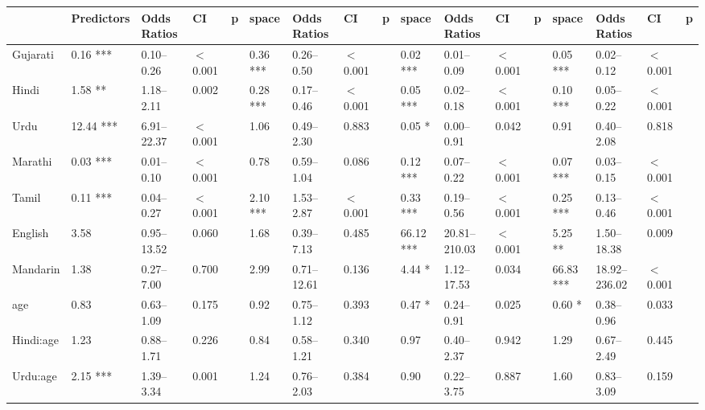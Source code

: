 \begin{table}[ht]
\centering
\begin{tabular}{}
  \hline
 & Predictors & Odds Ratios & CI & p & space & Odds Ratios & CI & p & space & Odds Ratios & CI & p & space & Odds Ratios & CI & p \\ 
  \hline

Gujarati & 0.16 *** & 0.10--0.26 & $<$0.001 &  & 0.36 *** & 0.26--0.50 & $<$0.001 &  & 0.02 *** & 0.01--0.09 & $<$0.001 &  & 0.05 *** & 0.02--0.12 & $<$0.001 \\ 

Hindi & 1.58 ** & 1.18--2.11 & 0.002 &  & 0.28 *** & 0.17--0.46 & $<$0.001 &  & 0.05 *** & 0.02--0.18 & $<$0.001 &  & 0.10 *** & 0.05--0.22 & $<$0.001 \\ 

Urdu & 12.44 *** & 6.91--22.37 & $<$0.001 &  & 1.06 & 0.49--2.30 & 0.883 &  & 0.05 * & 0.00--0.91 & 0.042 &  & 0.91 & 0.40--2.08 & 0.818 \\ 

Marathi & 0.03 *** & 0.01--0.10 & $<$0.001 &  & 0.78 & 0.59--1.04 & 0.086 &  & 0.12 *** & 0.07--0.22 & $<$0.001 &  & 0.07 *** & 0.03--0.15 & $<$0.001 \\ 

Tamil & 0.11 *** & 0.04--0.27 & $<$0.001 &  & 2.10 *** & 1.53--2.87 & $<$0.001 &  & 0.33 *** & 0.19--0.56 & $<$0.001 &  & 0.25 *** & 0.13--0.46 & $<$0.001 \\ 

English & 3.58 & 0.95--13.52 & 0.060 &  & 1.68 & 0.39--7.13 & 0.485 &  & 66.12 *** & 20.81--210.03 & $<$0.001 &  & 5.25 ** & 1.50--18.38 & 0.009 \\ 
Mandarin & 1.38 & 0.27--7.00 & 0.700 &  & 2.99 & 0.71--12.61 & 0.136 &  & 4.44 * & 1.12--17.53 & 0.034 &  & 66.83 *** & 18.92--236.02 & $<$0.001 \\ 

age & 0.83 & 0.63--1.09 & 0.175 &  & 0.92 & 0.75--1.12 & 0.393 &  & 0.47 * & 0.24--0.91 & 0.025 &  & 0.60 * & 0.38--0.96 & 0.033 \\ 

Hindi:age & 1.23 & 0.88--1.71 & 0.226 &  & 0.84 & 0.58--1.21 & 0.340 &  & 0.97 & 0.40--2.37 & 0.942 &  & 1.29 & 0.67--2.49 & 0.445 \\ 

Urdu:age & 2.15 *** & 1.39--3.34 & 0.001 &  & 1.24 & 0.76--2.03 & 0.384 &  & 0.90 & 0.22--3.75 & 0.887 &  & 1.60 & 0.83--3.09 & 0.159 \\ 


\end{tabular}
\end{table}
